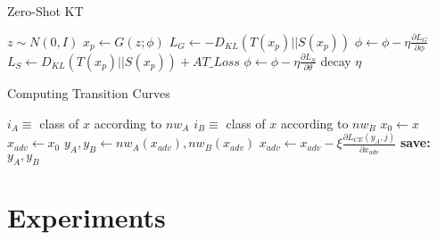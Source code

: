\documentclass{article}
\begin{document}
\begin{minipage}{0.44\textwidth}
\begin{algorithm}[H]
    \centering
    \caption{Zero-Shot KT}\label{algorithm1}
    \begin{algorithmic}[1]
        \State {}
        \State {}
        \State {}
            \State $z\sim N(0,I)$
                \State $x_p \gets G(z;\phi)$
                \State $L_G \gets -D_{KL}(T(x_p) || S(x_p))$
                \State $\phi \gets \phi-\eta\frac{\partial L_G}{\partial \phi}$
            \EndFor
            \State $L_S \gets D_{KL}(T(x_p) || S(x_p)) + AT\_Loss$
            \State $\phi \gets \phi-\eta\frac{\partial L_S}{\partial \theta}$
            \EndFor
            \State decay $\eta$
        \EndFor
    \end{algorithmic}
\end{algorithm}
\end{minipage}
\hfill
\begin{minipage}{0.55\textwidth}
\begin{algorithm}[H]
    \centering
    \caption{Computing Transition Curves}\label{algorithm2}
    \begin{algorithmic}[1]
        \State {}
        \State {}

        \State $i_A\equiv$ class of $x$ according to $nw_A$
        \State $i_B\equiv$ class of $x$ according to $nw_B$
            \State $x_0 \gets x$
                \State $x_{adv} \gets x_0$
                    \State$y_A, y_B\gets nw_A(x_{adv}),nw_B(x_{adv})$
                    \State $x_{adv} \gets x_{adv}-\xi\frac{\partial L_{CE}(y_A,j)}{\partial x_{adv}}$
                    \State \textbf{save:} $y_A,y_B$
                    \EndFor
                \EndFor
            \EndIf
        \EndFor
    \end{algorithmic}
\end{algorithm}
\end{minipage}


\section{Experiments}\label{exp}
\end{document}
